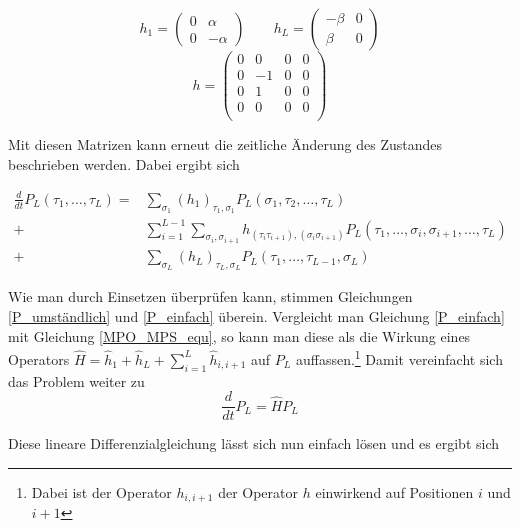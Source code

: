 \documentclass[10pt,a4paper]{report}
\begin{document}
\begin{equation}
h_1=
\begin{pmatrix}
0&\alpha\\ 0&-\alpha
\end{pmatrix}
\qquad
h_L=
\begin{pmatrix}
-\beta&0\\ \beta&0
\end{pmatrix}
\end{equation}
\vspace{1px}
\begin{equation*}
h=
\begin{pmatrix}
0&0&0&0\\
0&-1&0&0\\
0&1&0&0\\
0&0&0&0\\
\end{pmatrix}
\end{equation*}

Mit diesen Matrizen kann erneut die zeitliche Änderung des Zustandes beschrieben werden. Dabei ergibt sich

\begin{equation}\label{P_einfach}
\begin{split}
\frac{d}{dt}P_L(\tau_1,\ldots,\tau_L) =& \sum_{\sigma_1}(h_1)_{\tau_1,\sigma_1}P_L(\sigma_1,\tau_2,\ldots,\tau_L)\\
+&\sum_{i=1}^{L-1}\sum_{\sigma_i,\sigma_{i+1}}h_{(\tau_i\tau_{i+1}),(\sigma_i\sigma_{i+1})}P_L(\tau_1,\ldots,\sigma_i,\sigma_{i+1},\ldots,\tau_L)\\
+&\sum_{\sigma_L}(h_L)_{\tau_L,\sigma_L}P_L(\tau_1,\ldots,\tau_{L-1},\sigma_L)
\end{split}
\end{equation}

Wie man durch Einsetzen überprüfen kann, stimmen Gleichungen \ref{P_umständlich} und \ref{P_einfach} überein. Vergleicht man Gleichung \ref{P_einfach} mit Gleichung \ref{MPO_MPS_equ}, so kann man diese als die Wirkung eines Operators $\hat{H}=\hat{h}_1+\hat{h}_L+\sum_{i=1}^L\hat{h}_{i,i+1}$ auf $P_L$ auffassen.\footnote{Dabei ist der Operator $h_{i,i+1}$ der Operator $h$ einwirkend auf Positionen $i$ und $i+1$} Damit vereinfacht sich das Problem weiter zu
\begin{equation}
\frac{d}{dt}P_L=\hat{H}P_L
\end{equation}

Diese lineare Differenzialgleichung lässt sich nun einfach lösen und es ergibt sich
\end{document}
